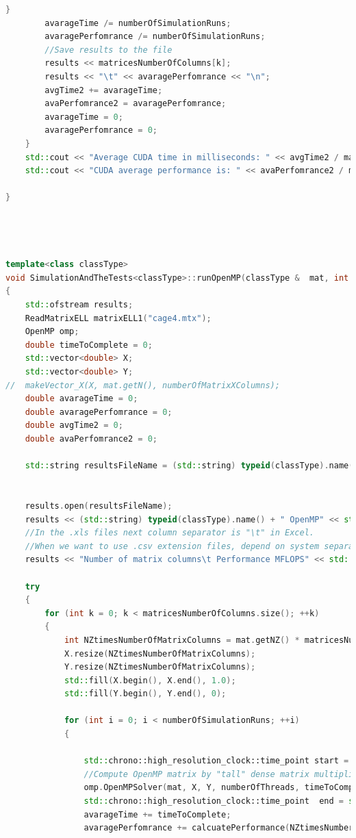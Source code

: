 \documentclass{scrreprt}
\begin{document}
\begin{lstlisting}[language=C++, caption=main.cu]
		}
		avarageTime /= numberOfSimulationRuns;
		avaragePerfomrance /= numberOfSimulationRuns;
		//Save results to the file
		results << matricesNumberOfColumns[k];
		results << "\t" << avaragePerfomrance << "\n";
		avgTime2 += avarageTime;
		avaPerfomrance2 = avaragePerfomrance;
		avarageTime = 0;
		avaragePerfomrance = 0;
	}
	std::cout << "Average CUDA time in milliseconds: " << avgTime2 / matricesNumberOfColumns.size() << " ms\n";
	std::cout << "CUDA average performance is: " << avaPerfomrance2 / matricesNumberOfColumns.size() << " MFLOPS\n" << std::endl;

}




template<class classType>
void SimulationAndTheTests<classType>::runOpenMP(classType &  mat, int numberOfThreads, int numberOfSimulationRuns)
{
	std::ofstream results;
	ReadMatrixELL matrixELL1("cage4.mtx");
	OpenMP omp;
	double timeToComplete = 0;
	std::vector<double> X;
	std::vector<double> Y;
//	makeVector_X(X, mat.getN(), numberOfMatrixXColumns);
	double avarageTime = 0;
	double avaragePerfomrance = 0;
	double avgTime2 = 0;
	double avaPerfomrance2 = 0;

	std::string resultsFileName = (std::string) typeid(classType).name() + "OpenMP" + mat.getMatrixName() + ".xls";
	

	results.open(resultsFileName); 
	results << (std::string) typeid(classType).name() + " OpenMP" << std::endl;
	//In the .xls files next column separator is "\t" in Excel. 
	//When we want to use .csv extension files, depend on system separator could be "," or ";" .
	results << "Number of matrix columns\t Performance MFLOPS" << std::endl;
	
	try
	{
		for (int k = 0; k < matricesNumberOfColumns.size(); ++k)
		{
			int NZtimesNumberOfMatrixColumns = mat.getNZ() * matricesNumberOfColumns[k];
			X.resize(NZtimesNumberOfMatrixColumns);
			Y.resize(NZtimesNumberOfMatrixColumns);
			std::fill(X.begin(), X.end(), 1.0);
			std::fill(Y.begin(), Y.end(), 0);

			for (int i = 0; i < numberOfSimulationRuns; ++i)
			{

				std::chrono::high_resolution_clock::time_point start = std::chrono::high_resolution_clock::now();
				//Compute OpenMP matrix by "tall" dense matrix multiplication product
				omp.OpenMPSolver(mat, X, Y, numberOfThreads, timeToComplete, matricesNumberOfColumns[k]);
				std::chrono::high_resolution_clock::time_point  end = std::chrono::high_resolution_clock::now();
				avarageTime += timeToComplete;
				avaragePerfomrance += calcuatePerformance(NZtimesNumberOfMatrixColumns, timeToComplete);


\end{lstlisting}
\end{document}
